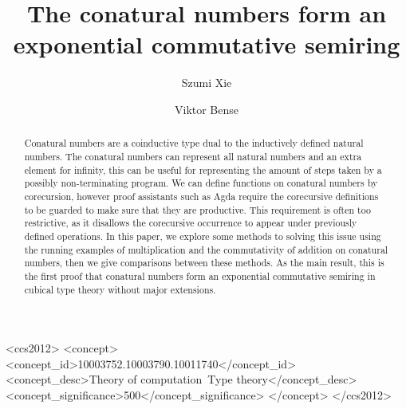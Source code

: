 \documentclass[sigplan, screen, natbib=false, review]{acmart}
\begin{document}
\title{The conatural numbers form an exponential commutative semiring}

\author{Szumi Xie}

\author{Viktor Bense}


\begin{abstract}
  Conatural numbers are a coinductive type dual to the inductively defined
  natural numbers. The conatural numbers can represent all natural numbers and
  an extra element for infinity, this can be useful for representing the amount
  of steps taken by a possibly non-terminating program. We can define functions
  on conatural numbers by corecursion, however proof assistants such as Agda
  require the corecursive definitions to be guarded to make sure that they are
  productive. This requirement is often too restrictive, as it disallows the
  corecursive occurrence to appear under previously defined operations. In this
  paper, we explore some methods to solving this issue using the running
  examples of multiplication and the commutativity of addition on conatural
  numbers, then we give comparisons between these methods. As the main result,
  this is the first proof that conatural numbers form an exponential commutative
  semiring in cubical type theory without major extensions.
\end{abstract}

\begin{CCSXML}
  <ccs2012>
  <concept>
  <concept_id>10003752.10003790.10011740</concept_id>
  <concept_desc>Theory of computation~Type theory</concept_desc>
  <concept_significance>500</concept_significance>
  </concept>
  </ccs2012>
\end{CCSXML}
\end{document}
